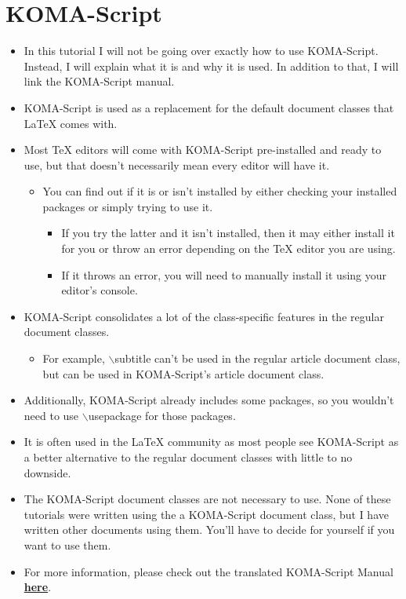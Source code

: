 \documentclass{article}
\begin{document}
	\newpage
	\section{KOMA-Script}
		\begin{itemize}
			\item In this tutorial I will not be going over exactly how to use KOMA-Script. Instead, I will explain what it is and why it is used. In addition to that, I will link the KOMA-Script manual.
			\item KOMA-Script is used as a replacement for the default document classes that \LaTeX{} comes with.
			\item Most \TeX{} editors will come with KOMA-Script pre-installed and ready to use, but that doesn\rq{}t necessarily mean every editor will have it.
			\begin{itemize}
				\item You can find out if it is or isn\rq{}t installed by either checking your installed packages or simply trying to use it.
				\begin{itemize}
					\item If you try the latter and it isn\rq{}t installed, then it may either install it for you or throw an error depending on the \TeX{} editor you are using.
					\item If it throws an error, you will need to manually install it using your editor's console.
				\end{itemize}
			\end{itemize}
			\item KOMA-Script consolidates a lot of the class-specific features in the regular document classes.
			\begin{itemize}
				\item For example, $\backslash$subtitle can\rq{}t be used in the regular article document class, but can be used in KOMA-Script's article document class.
			\end{itemize}
			\item Additionally, KOMA-Script already includes some packages, so you wouldn\rq{}t need to use $\backslash$usepackage for those packages.
			\item It is often used in the \LaTeX{} community as most people see KOMA-Script as a better alternative to the regular document classes with little to no downside.
			\item The KOMA-Script document classes are not necessary to use. None of these tutorials were written using the a KOMA-Script document class, but I have written other documents using them. You\rq{}ll have to decide for yourself if you want to use them.
			\item For more information, please check out the translated KOMA-Script Manual \href{http://texdoc.net/texmf-dist/doc/latex/koma-script/scrguien.pdf}{\textbf{here}}.
		\end{itemize}
	
\end{document}
